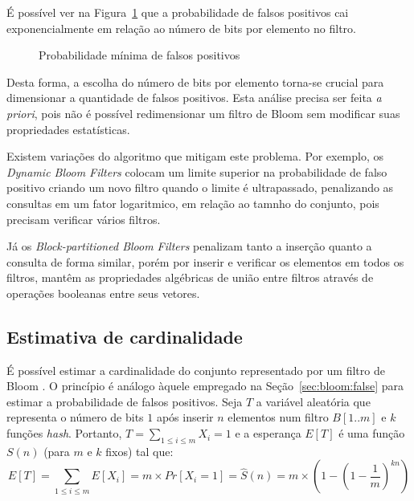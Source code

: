 É possível ver na Figura~\ref{fig:probfalso2} que a probabilidade de falsos positivos cai exponencialmente em relação ao número de bits por elemento no filtro.

\begin{figure}[!htbp]
\centering
{}
\caption{Probabilidade mínima de falsos positivos}
\label{fig:probfalso2}
\end{figure}

Desta forma, a escolha do número de bits por elemento torna-se crucial para dimensionar a quantidade de falsos positivos. Esta análise precisa ser feita \emph{a priori}, pois não é possível redimensionar um filtro de Bloom sem modificar suas propriedades estatísticas. 

Existem variações do algoritmo que mitigam este problema. Por exemplo, os \emph{Dynamic Bloom Filters} \cite{guo2010dynamic} colocam um limite superior na probabilidade de falso positivo criando um novo filtro quando o limite é ultrapassado, penalizando as consultas em um fator logaritmico, em relação ao tamnho do conjunto, pois precisam verificar vários filtros. 

Já os \emph{Block-partitioned Bloom Filters} \cite{papapetrou2010cardinality} penalizam tanto a inserção quanto a consulta de forma similar, porém por inserir e verificar os elementos em todos os filtros, mantêm as propriedades algébricas de união entre filtros através de operações booleanas entre seus vetores.

\subsection{Estimativa de cardinalidade}\label{sec:bloom:cardinality}

É possível estimar a cardinalidade do conjunto representado por um filtro de Bloom \cite{whang1990linear,papapetrou2010cardinality}. O princípio é análogo àquele empregado na Seção~\ref{sec:bloom:false} para estimar a probabilidade de falsos positivos. Seja $T$ a variável aleatória que representa o número de bits $1$ após inserir $n$ elementos num filtro $B[1..m]$ e $k$ funções \emph{hash}. Portanto, $T = \sum_{1 \leq i \leq m} X_i = 1$ e a esperança $E[T]$ é uma função $S(n)$ (para $m$ e $k$ fixos) tal que:
\[
E[T] = \sum_{1 \leq i \leq m} E[X_i] = m \times Pr[X_i = 1] = \hat{S}(n) = m \times \left( 1 - \left( 1 - \frac{1}{m}\right)^{kn} \right)
\]

